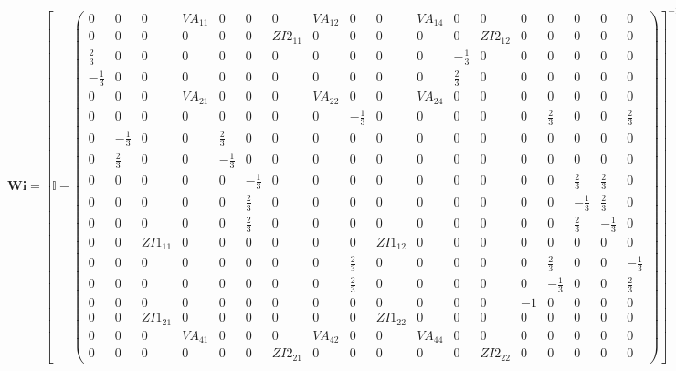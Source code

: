 \[ \mathbf{Wi} =  \left[ \mathbb{I}  - \left(\begin{smallmatrix} 0 & 0 & 0 & VA_{11} & 0 & 0 & 0 & VA_{12} & 0 & 0 & VA_{14} & 0 & 0 & 0 & 0 & 0 & 0 & 0 \\ 0 & 0 & 0 & 0 & 0 & 0 & ZI2_{11} & 0 & 0 & 0 & 0 & 0 & ZI2_{12} & 0 & 0 & 0 & 0 & 0 \\ \frac{2}{3} & 0 & 0 & 0 & 0 & 0 & 0 & 0 & 0 & 0 & 0 & -\frac{1}{3} & 0 & 0 & 0 & 0 & 0 & 0 \\ -\frac{1}{3} & 0 & 0 & 0 & 0 & 0 & 0 & 0 & 0 & 0 & 0 & \frac{2}{3} & 0 & 0 & 0 & 0 & 0 & 0 \\ 0 & 0 & 0 & VA_{21} & 0 & 0 & 0 & VA_{22} & 0 & 0 & VA_{24} & 0 & 0 & 0 & 0 & 0 & 0 & 0 \\ 0 & 0 & 0 & 0 & 0 & 0 & 0 & 0 & -\frac{1}{3} & 0 & 0 & 0 & 0 & 0 & \frac{2}{3} & 0 & 0 & \frac{2}{3} \\ 0 & -\frac{1}{3} & 0 & 0 & \frac{2}{3} & 0 & 0 & 0 & 0 & 0 & 0 & 0 & 0 & 0 & 0 & 0 & 0 & 0 \\ 0 & \frac{2}{3} & 0 & 0 & -\frac{1}{3} & 0 & 0 & 0 & 0 & 0 & 0 & 0 & 0 & 0 & 0 & 0 & 0 & 0 \\ 0 & 0 & 0 & 0 & 0 & -\frac{1}{3} & 0 & 0 & 0 & 0 & 0 & 0 & 0 & 0 & 0 & \frac{2}{3} & \frac{2}{3} & 0 \\ 0 & 0 & 0 & 0 & 0 & \frac{2}{3} & 0 & 0 & 0 & 0 & 0 & 0 & 0 & 0 & 0 & -\frac{1}{3} & \frac{2}{3} & 0 \\ 0 & 0 & 0 & 0 & 0 & \frac{2}{3} & 0 & 0 & 0 & 0 & 0 & 0 & 0 & 0 & 0 & \frac{2}{3} & -\frac{1}{3} & 0 \\ 0 & 0 & ZI1_{11} & 0 & 0 & 0 & 0 & 0 & 0 & ZI1_{12} & 0 & 0 & 0 & 0 & 0 & 0 & 0 & 0 \\ 0 & 0 & 0 & 0 & 0 & 0 & 0 & 0 & \frac{2}{3} & 0 & 0 & 0 & 0 & 0 & \frac{2}{3} & 0 & 0 & -\frac{1}{3} \\ 0 & 0 & 0 & 0 & 0 & 0 & 0 & 0 & \frac{2}{3} & 0 & 0 & 0 & 0 & 0 & -\frac{1}{3} & 0 & 0 & \frac{2}{3} \\ 0 & 0 & 0 & 0 & 0 & 0 & 0 & 0 & 0 & 0 & 0 & 0 & 0 & -1 & 0 & 0 & 0 & 0 \\ 0 & 0 & ZI1_{21} & 0 & 0 & 0 & 0 & 0 & 0 & ZI1_{22} & 0 & 0 & 0 & 0 & 0 & 0 & 0 & 0 \\ 0 & 0 & 0 & VA_{41} & 0 & 0 & 0 & VA_{42} & 0 & 0 & VA_{44} & 0 & 0 & 0 & 0 & 0 & 0 & 0 \\ 0 & 0 & 0 & 0 & 0 & 0 & ZI2_{21} & 0 & 0 & 0 & 0 & 0 & ZI2_{22} & 0 & 0 & 0 & 0 & 0 \end{smallmatrix}\right) \right]^{-1}  \]
